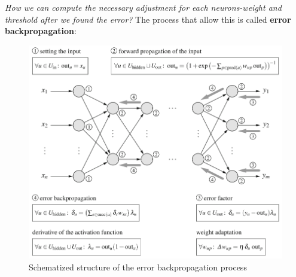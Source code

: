 \documentclass{article}
\begin{document}
\noindent\textit{How we can compute the necessary adjustment for each
    neurons-weight and threshold after we found the error?}
\newline
The process that allow this is called \textbf{error backpropagation}:
\begin{figure}[H]
    \centering
    \includegraphics[scale=0.5]{images/error_backpropagation.png}
    \caption{Schematized structure of the error backpropagation process}
    \label{fig:error_backpropagation}
\end{figure}
\end{document}
